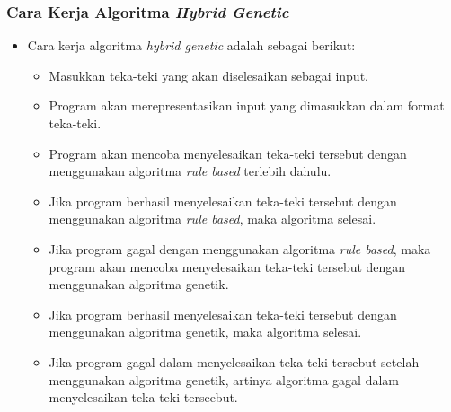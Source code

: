 \documentclass{beamer}
\begin{document}

\begin{frame}
\frametitle{Cara Kerja Algoritma \textit{Hybrid Genetic}}
\begin{itemize}
\item Cara kerja algoritma \textit{hybrid genetic} adalah sebagai berikut:
	\begin{itemize}
	\item Masukkan teka-teki yang akan diselesaikan sebagai input.
	\item Program akan merepresentasikan input yang dimasukkan dalam format teka-teki.
	\item Program akan mencoba menyelesaikan teka-teki tersebut dengan menggunakan algoritma \textit{rule based} terlebih dahulu.
	\item Jika program berhasil menyelesaikan teka-teki tersebut dengan menggunakan algoritma \textit{rule based}, maka algoritma selesai.
	\item Jika program gagal dengan menggunakan algoritma \textit{rule based}, maka program akan mencoba menyelesaikan teka-teki tersebut dengan menggunakan algoritma genetik.
	\item Jika program berhasil menyelesaikan teka-teki tersebut dengan menggunakan algoritma genetik, maka algoritma selesai.
	\item Jika program gagal dalam menyelesaikan teka-teki tersebut setelah menggunakan algoritma genetik, artinya algoritma gagal dalam menyelesaikan teka-teki terseebut.
	\end{itemize}
\end{itemize}
\end{frame}
\end{document}
